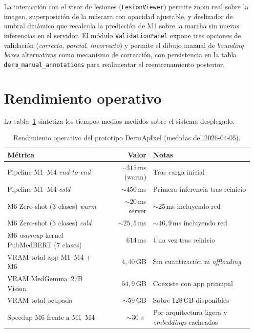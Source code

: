 La interacción con el visor de lesiones
(\texttt{LesionViewer}) permite zoom real sobre la imagen,
superposición de la máscara con opacidad ajustable, y deslizador
de umbral dinámico que recalcula la predicción de M1 sobre la
marcha sin nuevas inferencias en el servidor. El módulo
\texttt{ValidationPanel} expone tres opciones de validación
(\emph{correcto}, \emph{parcial}, \emph{incorrecto}) y permite el
dibujo manual de \emph{bounding boxes} alternativas como mecanismo
de corrección, con persistencia en la tabla
\texttt{derm\_manual\_annotations} para realimentar el
reentrenamiento posterior.

\section{Rendimiento operativo}
\label{sec:dermapixel-rendimiento}

La tabla~\ref{tab:dermapixel-rendimiento} sintetiza los tiempos
medios medidos sobre el sistema desplegado.

\begin{table}[H]
\centering
\footnotesize
\setlength{\tabcolsep}{4pt}
\renewcommand{\arraystretch}{0.95}
\caption{Rendimiento operativo del prototipo DermApIxel (medidas
del 2026-04-05).}
\label{tab:dermapixel-rendimiento}
\begin{tabular}{lrl}
\hline
Métrica                                          & Valor               & Notas \\
\hline
Pipeline M1--M4 \emph{end-to-end}                 & $\sim 315$\,ms (warm) & Tras carga inicial \\
Pipeline M1--M4 \emph{cold}                       & $\sim 450$\,ms        & Primera inferencia tras reinicio \\
M6 Zero-shot ($3$ clases) \emph{warm}             & $\sim 20$\,ms server  & $\sim 25$\,ms incluyendo red \\
M6 Zero-shot ($3$ clases) \emph{cold}             & $\sim 25{,}5$\,ms     & $\sim 46{,}9$\,ms incluyendo red \\
M6 \emph{warmup} kernel PubMedBERT ($7$ clases)   & $614$\,ms             & Una vez tras reinicio \\
VRAM total app M1--M4 + M6                        & $4{,}40$\,GB         & Sin cuantización ni \emph{offloading} \\
VRAM MedGemma~27B Vision                          & $54{,}9$\,GB         & Coexiste con app principal \\
VRAM total ocupada                                & $\sim 59$\,GB        & Sobre $128$\,GB disponibles \\
Speedup M6 frente a M1--M4                        & $\sim 30\times$       & Por arquitectura ligera y \emph{embeddings} cacheados \\
\hline
\end{tabular}
\end{table}

